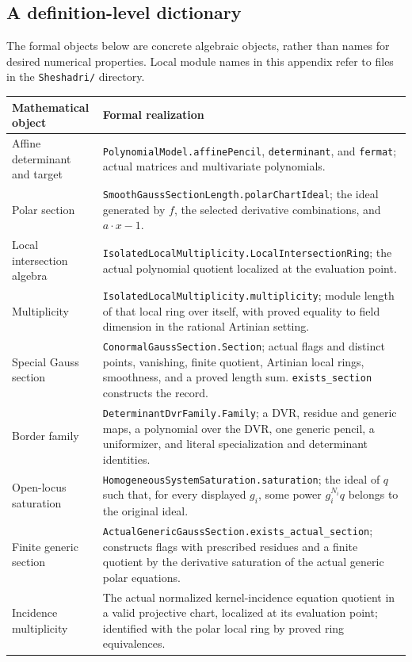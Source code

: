 \subsection{A definition-level dictionary}
\label{app:lean-dictionary}

The formal objects below are concrete algebraic objects, rather than names
for desired numerical properties.  Local module names in this appendix
refer to files in the \nolinkurl{Sheshadri/} directory.

\begingroup\small
\begin{longtable}{@{}>{\raggedright\arraybackslash}p{}>{\raggedright\arraybackslash}p{}@{}}
\toprule
Mathematical object & Formal realization\\
\midrule
\endhead
Affine determinant and target &
\nolinkurl{PolynomialModel.affinePencil},
\nolinkurl{determinant}, and \nolinkurl{fermat}; actual matrices and
multivariate polynomials.\\[4pt]
Polar section &
\nolinkurl{SmoothGaussSectionLength.polarChartIdeal}; the ideal generated
by $f$, the selected derivative combinations, and $a\cdot x-1$.\\[4pt]
Local intersection algebra &
\nolinkurl{IsolatedLocalMultiplicity.LocalIntersectionRing}; the actual
polynomial quotient localized at the evaluation point.\\[4pt]
Multiplicity &
\nolinkurl{IsolatedLocalMultiplicity.multiplicity}; module length of that
local ring over itself, with proved equality to field dimension in the
rational Artinian setting.\\[4pt]
Special Gauss section &
\nolinkurl{ConormalGaussSection.Section}; actual flags and distinct points,
vanishing, finite quotient, Artinian local rings, smoothness, and a proved
length sum.  \nolinkurl{exists_section} constructs the record.\\[4pt]
Border family &
\nolinkurl{DeterminantDvrFamily.Family}; a DVR, residue and generic maps,
a polynomial over the DVR, one generic pencil, a uniformizer, and literal
specialization and determinant identities.\\[4pt]
Open-locus saturation &
\nolinkurl{HomogeneousSystemSaturation.saturation}; the ideal of $q$ such
that, for every displayed $g_i$, some power $g_i^{N_i}q$ belongs to the
original ideal.\\[4pt]
Finite generic section &
\nolinkurl{ActualGenericGaussSection.exists_actual_section}; constructs
flags with prescribed residues and a finite quotient by the derivative
saturation of the actual generic polar equations.\\[4pt]
Incidence multiplicity &
The actual normalized kernel-incidence equation quotient in a valid
projective chart, localized at its evaluation point; identified with the
polar local ring by proved ring equivalences.\\
\bottomrule
\end{longtable}
\endgroup

